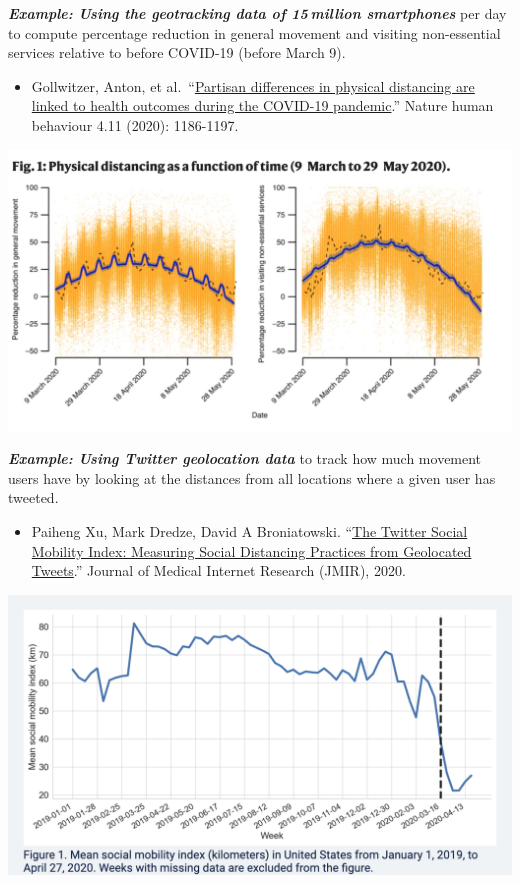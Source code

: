 \documentclass[
  letterpaper,
  DIV=11,
  numbers=noendperiod]{scrreprt}
\providecommand{\tightlist}{%
  \setlength{\itemsep}{0pt}\setlength{\parskip}{0pt}}\usepackage{longtable,booktabs,array}
\begin{document}
\textbf{\emph{Example: Using the geotracking data of 15 million
smartphones}} per day to compute percentage reduction in general
movement and visiting non-essential services relative to before COVID-19
(before March 9).

\begin{itemize}
\tightlist
\item
  Gollwitzer, Anton, et
  al.~``\href{https://www.nature.com/articles/s41562-020-00977-7}{Partisan
  differences in physical distancing are linked to health outcomes
  during the COVID-19 pandemic}.'' Nature human behaviour 4.11 (2020):
  1186-1197.
\end{itemize}

\includegraphics{images/covidphone.png}

\textbf{\emph{Example: Using Twitter geolocation data}} to track how
much movement users have by looking at the distances from all locations
where a given user has tweeted.

\begin{itemize}
\tightlist
\item
  Paiheng Xu, Mark Dredze, David A Broniatowski.
  ``\href{https://socialmobility.covid19dataresources.org/}{The Twitter
  Social Mobility Index: Measuring Social Distancing Practices from
  Geolocated Tweets}.'' Journal of Medical Internet Research (JMIR),
  2020.
\end{itemize}

\includegraphics{images/covidtwitter.png}
\end{document}
